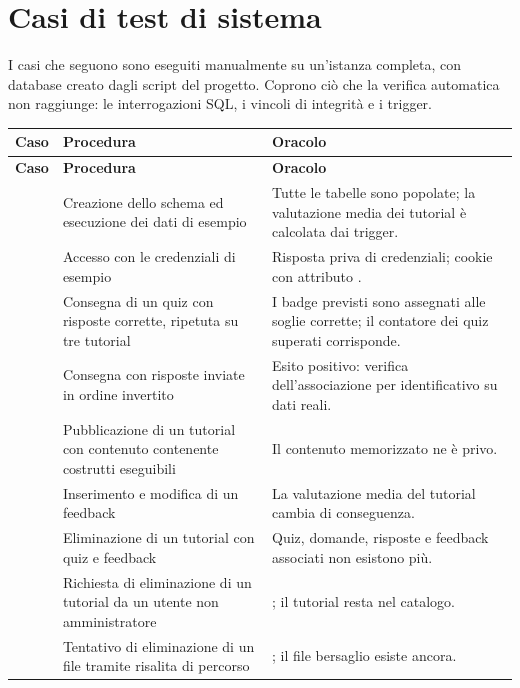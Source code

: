 \section{Casi di test di sistema}
\label{sec:td-sistema}

I casi che seguono sono eseguiti manualmente su un'istanza completa, con
database creato dagli script del progetto. Coprono ciò che la verifica
automatica non raggiunge: le interrogazioni SQL, i vincoli di integrità e i
trigger.

\begin{longtable}{@{}l L{5.0cm} L{7.4cm}@{}}
\toprule
\textbf{Caso} & \textbf{Procedura} & \textbf{Oracolo} \\
\midrule
\endfirsthead
\toprule
\textbf{Caso} & \textbf{Procedura} & \textbf{Oracolo} \\
\midrule
\endhead
\bottomrule
\endlastfoot

 & Creazione dello schema ed esecuzione dei dati di esempio &
Tutte le tabelle sono popolate; la valutazione media dei tutorial è
calcolata dai trigger. \\

 & Accesso con le credenziali di esempio &
Risposta priva di credenziali; cookie con attributo . \\

 & Consegna di un quiz con risposte corrette, ripetuta su tre
  tutorial &
I badge previsti sono assegnati alle soglie corrette; il contatore dei quiz
superati corrisponde. \\

 & Consegna con risposte inviate in ordine invertito &
Esito positivo: verifica dell'associazione per identificativo su dati reali. \\

 & Pubblicazione di un tutorial con contenuto contenente
  costrutti eseguibili &
Il contenuto memorizzato ne è privo. \\

 & Inserimento e modifica di un feedback &
La valutazione media del tutorial cambia di conseguenza. \\

 & Eliminazione di un tutorial con quiz e feedback &
Quiz, domande, risposte e feedback associati non esistono più. \\

 & Richiesta di eliminazione di un tutorial da un utente non
  amministratore & ; il tutorial resta nel catalogo. \\

 & Tentativo di eliminazione di un file tramite risalita di
  percorso & ; il file bersaglio esiste ancora. \\

\end{longtable}
